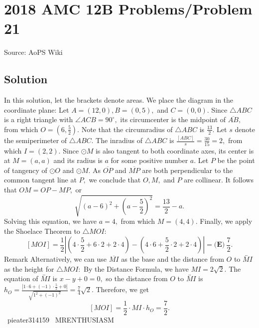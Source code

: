 \documentclass[12pt]{article}
\begin{document}
\section*{{2018 AMC 12B Problems/Problem 21}}
Source: AoPS Wiki

\subsection*{Solution}
In this solution, let the brackets denote areas. We place the diagram in the coordinate plane: Let $A=(12,0),B=(0,5),$ and $C=(0,0).$ Since $\triangle ABC$ is a right triangle with $\angle ACB=90^\circ,$ its circumcenter is the midpoint of $\overline{AB},$ from which $O=\left(6,\frac52\right).$ Note that the circumradius of $\triangle ABC$ is $\frac{13}{2}.$ Let $s$ denote the semiperimeter of $\triangle ABC.$ The inradius of $\triangle ABC$ is $\frac{[ABC]}{s}=\frac{30}{15}=2,$ from which $I=(2,2).$ Since $\odot M$ is also tangent to both coordinate axes, its center is at $M=(a,a)$ and its radius is $a$ for some positive number $a.$ Let $P$ be the point of tangency of $\odot O$ and $\odot M.$ As $\overline{OP}$ and $\overline{MP}$ are both perpendicular to the common tangent line at $P,$ we conclude that $O,M,$ and $P$ are collinear. It follows that $OM=OP-MP,$ or \[\sqrt{(a-6)^2+\left(a-\frac52\right)^2}=\frac{13}{2}-a.\] Solving this equation, we have $a=4,$ from which $M=(4,4).$ Finally, we apply the Shoelace Theorem to $\triangle MOI:$ \[[MOI]=\frac12\left|\left(4\cdot\frac52+6\cdot2+2\cdot4\right)-\left(4\cdot6+\frac52\cdot2+2\cdot4\right)\right|=\boxed{\textbf{(E)}\ \frac72}.\] Remark Alternatively, we can use $\overline{MI}$ as the base and the distance from $O$ to $\overleftrightarrow{MI}$ as the height for $\triangle MOI:$ By the Distance Formula, we have $MI=2\sqrt2.$ The equation of $\overleftrightarrow{MI}$ is $x-y+0=0,$ so the distance from $O$ to $\overleftrightarrow{MI}$ is $h_O=\frac{\left|1\cdot6+(-1)\cdot\frac52+0\right|}{\sqrt{1^2+(-1)^2}}=\frac74\sqrt2.$ Therefore, we get \[[MOI]=\frac12\cdot MI\cdot h_O=\frac72.\] ~pieater314159 ~MRENTHUSIASM
\end{document}

